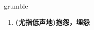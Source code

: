 
\begin{frame}
{\huge grumble}
\begin{center}
\begin{enumerate}\Large
  \item \textbf{(尤指低声地)抱怨，埋怨}
\end{enumerate}
\end{center}
\end{frame}
